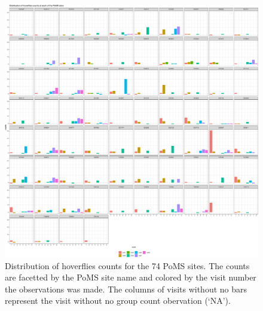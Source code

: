 \documentclass[
]{article}
\begin{document}
\begin{figure}

{\centering \includegraphics{SupplementaryInformationOne_files/figure-pdf/fig-hvGCPlot-1.pdf}

}

\caption{\label{fig-hvGCPlot}Distribution of hoverflies counts for the
74 PoMS sites. The counts are facetted by the PoMS site name and colored
by the visit number the observations was made. The columns of visits
without no bars represent the visit without no group count obervation
(`NA').}

\end{figure}
\end{document}
